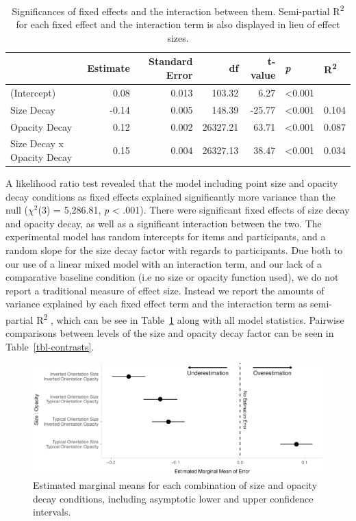 \documentclass[manuscript, review, anonymous, screen]{acmart}
\begin{document}
\hypertarget{tbl-sig}{}
\begin{table}
\caption{\label{tbl-sig}Significances of fixed effects and the interaction between them.
Semi-partial R\textsuperscript{2} for each fixed effect and the
interaction term is also displayed in lieu of effect sizes. }\tabularnewline

\centering
\begin{tabular}{lrrrrll}
\toprule
  & Estimate & Standard Error & df & t-value & \textit{p} & R\textsuperscript{2}\\
\midrule
(Intercept) & 0.08 & 0.013 & 103.32 & 6.27 & <0.001 & \\
Size Decay & -0.14 & 0.005 & 148.39 & -25.77 & <0.001 & 0.104\\
Opacity Decay & 0.12 & 0.002 & 26327.21 & 63.71 & <0.001 & 0.087\\
Size Decay x Opacity Decay & 0.15 & 0.004 & 26327.13 & 38.47 & <0.001 & 0.034\\
\bottomrule
\end{tabular}
\end{table}

A likelihood ratio test revealed that the model including point size and
opacity decay conditions as fixed effects explained significantly more
variance than the null (\(\chi^2\)(3) = 5,286.81, \emph{p} \textless{}
.001). There were significant fixed effects of size decay and opacity
decay, as well as a significant interaction between the two. The
experimental model has random intercepts for items and participants, and
a random slope for the size decay factor with regards to participants.
Due both to our use of a linear mixed model with an interaction term,
and our lack of a comparative baseline condition (i.e no size or opacity
function used), we do not report a traditional measure of effect size.
Instead we report the amounts of variance explained by each fixed effect
term and the interaction term as semi-partial R\textsuperscript{2}
\citep{nakagawa_2013}, which can be see in Table~\ref{tbl-sig} along
with all model statistics. Pairwise comparisons between levels of the
size and opacity decay factor can be seen in Table~\ref{tbl-contrasts}.

\begin{figure}

{\centering \includegraphics[width=1\textwidth,height=\textheight]{size_and_opacity_files/figure-pdf/fig-emm-plot-1.pdf}

}

\caption{\label{fig-emm-plot}Estimated marginal means for each
combination of size and opacity decay conditions, including asymptotic
lower and upper confidence intervals.}

\end{figure}
\end{document}
